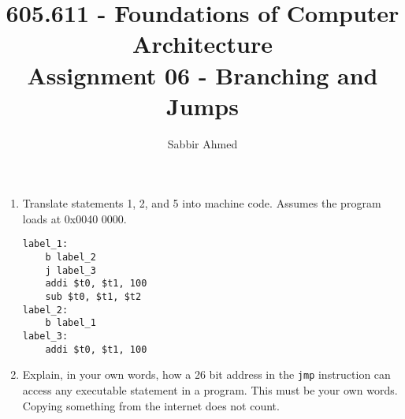 \documentclass[12pt]{article}
\begin{document}
  \title{605.611 - Foundations of Computer Architecture \\ Assignment 06 - Branching and Jumps\vspace{-0.5em}}
  \author{Sabbir Ahmed}
  \maketitle
  \vspace{-1em}

  \begin{enumerate}

    \item Translate statements 1, 2, and 5 into machine code.  Assumes the program loads at 0x0040 0000.

    \begin{lstlisting}
label_1:
    b label_2
    j label_3
    addi $t0, $t1, 100
    sub $t0, $t1, $t2
label_2:
    b label_1
label_3:
    addi $t0, $t1, 100
    \end{lstlisting}

    \item Explain, in your own words, how a 26 bit address in the \texttt{jmp} instruction can access any executable statement in a program. This must be your own words. Copying something from the internet does not count.

  \end{enumerate}
\end{document}
